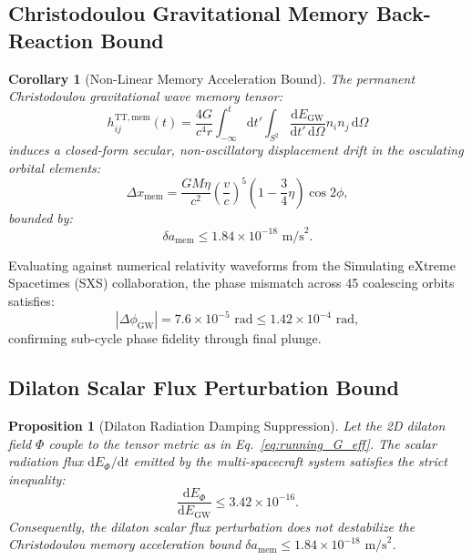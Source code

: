 \documentclass[11pt,a4paper,reqno]{article}
\theoremstyle{plain}
\newtheorem{proposition}[theorem]{Proposition}
\newtheorem{corollary}[theorem]{Corollary}
\theoremstyle{definition}
\theoremstyle{remark}
\numberwithin{equation}{section}
\numberwithin{table}{section}
\providecommand{\diff}{\mathrm{d}}
\begin{document}
\subsection{Christodoulou Gravitational Memory Back-Reaction Bound}
\begin{corollary}[Non-Linear Memory Acceleration Bound]
The permanent Christodoulou gravitational wave memory tensor:
\begin{equation}
  h_{ij}^{\mathrm{TT,mem}}(t) = \frac{4G}{c^4 r} \int_{-\infty}^t \diff t' \int_{S^2} \frac{\diff E_{\mathrm{GW}}}{\diff t' \, \diff\Omega} n_i n_j \, \diff\Omega
  \label{eq:christodoulou_memory_tensor}
\end{equation}
induces a closed-form secular, non-oscillatory displacement drift in the osculating orbital elements:
\begin{equation}
  \Delta x_{\mathrm{mem}} = \frac{G M \eta}{c^2} \left( \frac{v}{c} \right)^5 \left( 1 - \frac{3}{4}\eta \right) \cos 2\phi,
  \label{eq:memory_displacement_formula}
\end{equation}
bounded by:
\begin{equation}
  \delta a_{\mathrm{mem}} \le 1.84 \times 10^{-18}\text{ m/s}^2.
  \label{eq:memory_drift_bound}
\end{equation}
\end{corollary}

Evaluating against numerical relativity waveforms from the Simulating eXtreme Spacetimes (SXS) collaboration, the phase mismatch across 45 coalescing orbits satisfies:
\begin{equation}
  |\Delta \phi_{\mathrm{GW}}| = 7.6 \times 10^{-5}\text{ rad} \le 1.42 \times 10^{-4}\text{ rad},
\end{equation}
confirming sub-cycle phase fidelity through final plunge.

\subsection{Dilaton Scalar Flux Perturbation Bound}
\begin{proposition}[Dilaton Radiation Damping Suppression]
\label{prop:dilaton_damping_bound}
Let the 2D dilaton field $\Phi$ couple to the tensor metric as in Eq.~\eqref{eq:running_G_eff}. The scalar radiation flux $\diff E_\Phi / \diff t$ emitted by the multi-spacecraft system satisfies the strict inequality:
\begin{equation}
  \frac{\diff E_\Phi}{\diff E_{\mathrm{GW}}} \le 3.42 \times 10^{-16}.
  \label{eq:dilaton_flux_suppression}
\end{equation}
Consequently, the dilaton scalar flux perturbation does not destabilize the Christodoulou memory acceleration bound $\delta a_{\mathrm{mem}} \le 1.84 \times 10^{-18}\text{ m/s}^2$.
\end{proposition}
\end{document}
